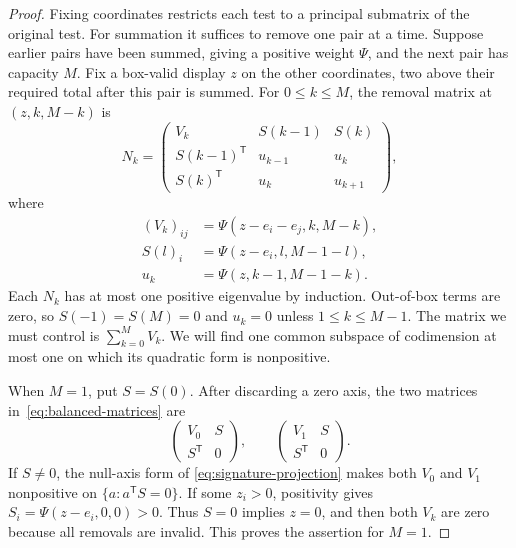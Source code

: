 \begin{proof}
Fixing coordinates restricts each test to a principal submatrix of
the original test.  For summation it suffices to remove one pair at
a time.  Suppose earlier pairs have been summed, giving a positive
weight $\Psi$, and the next pair has capacity $M$.
Fix a box-valid display $z$ on the other coordinates, two above
their required total after this pair is summed.
For $0\le k\le M$, the removal matrix at $(z,k,M-k)$ is
\begin{equation}
 N_k=
 \begin{pmatrix}
  V_k&S(k-1)&S(k)\\
  S(k-1)^{\mathsf T}&u_{k-1}&u_k\\
  S(k)^{\mathsf T}&u_k&u_{k+1}
 \end{pmatrix},
 \label{eq:balanced-matrices}
\end{equation}
where
\begin{align*}
 (V_k)_{ij}&=\Psi(z-e_i-e_j,k,M-k),\\
 S(l)_i&=\Psi(z-e_i,l,M-1-l),\\
 u_k&=\Psi(z,k-1,M-1-k).
\end{align*}
Each $N_k$ has at most one positive eigenvalue by induction.
Out-of-box terms are zero, so $S(-1)=S(M)=0$ and $u_k=0$
unless $1\le k\le M-1$.
The matrix we must control is $\sum_{k=0}^M V_k$.
We will find one common subspace of codimension at most one on
which its quadratic form is nonpositive.

When $M=1$, put $S=S(0)$.  After discarding a zero axis, the two
matrices in~\eqref{eq:balanced-matrices} are
\[
 \begin{pmatrix}V_0&S\\S^{\mathsf T}&0\end{pmatrix},
 \qquad
 \begin{pmatrix}V_1&S\\S^{\mathsf T}&0\end{pmatrix}.
\]
If $S\ne0$, the null-axis form of
\eqref{eq:signature-projection} makes both $V_0$ and $V_1$
nonpositive on $\{a:a^{\mathsf T}S=0\}$.
If some $z_i>0$, positivity gives
$S_i=\Psi(z-e_i,0,0)>0$.  Thus $S=0$ implies $z=0$, and then
both $V_k$ are zero because all removals are invalid.
This proves the assertion for $M=1$.


\end{proof}
